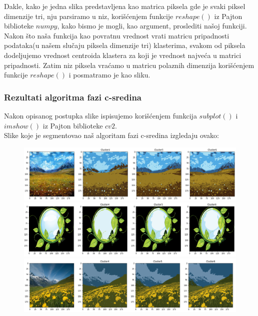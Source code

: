 \documentclass{article}
\begin{document}
Dakle, kako je jedna slika predstavljena kao matrica piksela gde je svaki piksel dimenzije tri, nju parsiramo u niz, kori\v{s}\'{c}enjem funkcije  $ reshape() $ iz Pajton biblioteke $ numpy $, kako bismo je mogli, kao argument, proslediti na\v{s}oj funkciji. Nakon \v{s}to na\v{s}a funkcija kao povratnu vrednost vrati matricu pripadnosti podataka(u na\v{s}em slu\v{c}aju piksela dimenzije tri) klasterima, svakom od piksela dodeljujemo vrednost centroida klastera za koji je vrednost najve\'ca u matrici pripadnosti. Zatim niz piksela vra\'{c}amo u matricu polaznih dimenzija kori\v{s}\'{c}enjem funkcije  $ reshape() $ i posmatramo je kao sliku.\\

\selectfont

\newpage

\subsubsection{\selectfont Rezultati algoritma fazi c-sredina}

Nakon opisanog postupka slike ispisujemo kori\v{s}\'{c}enjem funkcija $ subplot() $ i $ imshow() $ iz Pajton biblioteke $ cv2 $.\\
Slike koje je segmentovao na\v{s} algoritam fazi c-sredina izgledaju ovako:

\begin{figure}[h!]
\centerline{\includegraphics[scale=0.45]{images/segmented_fuzzy_c_means1.png}}
\centerline{\includegraphics[scale=0.45]{images/segmented_fuzzy_c_means3.png}}
\centerline{\includegraphics[scale=0.45]{images/segmented_fuzzy_c_means6.png}}
\end{figure}
\end{document}

